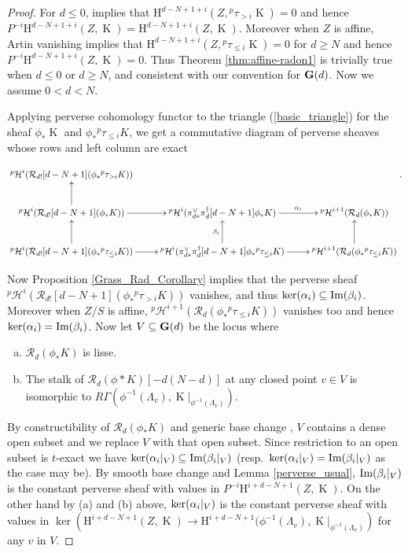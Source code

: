 \documentclass[12pt, reqno]{amsart}
\theoremstyle{plain}
\theoremstyle{definition}
\theoremstyle{definition}
\newcommand{\bG}{{\bf G}}
\newcommand{\cR}{{\mathcal R}}
\newcommand{\cpH}{{^p\mathcal{H}}}
\DeclareMathOperator{\KK}{K}
\begin{document}
\begin{proof}\label{proof_thm_affine_Rad}
For $d \leq 0$, \cite[4.2.4]{BBDG18} implies that $\mathrm{H}^{d-N+1+i}(Z, {}^p\tau_{>i}\KK)=0$ and hence $P^{-i}\mathrm{H}^{d-N+1+i}(Z, \KK)=\mathrm{H}^{d-N+1+i}(Z, \KK)$. Moreover when $Z$ is affine, Artin vanishing implies that $\mathrm{H}^{d-N+1+i}(Z, {}^p\tau_{\leq i}\KK)=0$ for $d \geq N$ and hence $P^{-i}\mathrm{H}^{d-N+1+i}(Z, \KK)=0$. Thus Theorem \ref{thm:affine-radon1} is trivially true when $d\leq0$ or $d \geq N$, and consistent with our convention for $\bG(d)$. Now we assume $0<d<N$.

Applying perverse cohomology functor to the triangle (\ref{basic_triangle}) for the sheaf $\phi_*\KK$ and $\phi_*{}^p\tau_{ \leq i}K$, we get a commutative diagram of perverse sheaves whose rows and left column are exact

   \begin{equation*}
       \xymatrix{  \cpH^i(\cR_{d!}[d-N+1](\phi_*{}^p\tau_{>i}K)) & & \\
                   \cpH^i(\cR_{d!}[d-N+1](\phi_*K)) \ar[r] \ar[u] & \cpH^i(\pi^{\vee}_{d*}\pi_d^{\dagger}[d-N+1]\phi_*K) \ar^-{\alpha_i}[r] & \cpH^{i+1}(\cR_d(\phi_*K)) \\
                   \cpH^i(\cR_{d!}[d-N+1](\phi_*{}^p\tau_{ \leq i}K)) \ar[r] \ar[u] & \cpH^i(\pi^{\vee}_{d*}\pi_d^{\dagger}[d-N+1]\phi_*{}^p\tau_{ \leq i}K) \ar[r] \ar^-{\beta_i}[u] & \cpH^{i+1}(\cR_d(\phi_*{}^p\tau_{ \leq i}K)) \ar[u] }.
   \end{equation*}

Now Proposition \ref{Grass_Rad_Corollary} implies that the perverse sheaf $\cpH^i(\cR_{d!}[d-N+1](\phi_*{}^p\tau_{>i}K))$ vanishes, and thus $\textup{ker}(\alpha_i) \subseteq \textup{Im}(\beta_i)$. Moreover when $Z/S$ is affine, $\cpH^{i+1}(\cR_d(\phi_*{}^p\tau_{ \leq i}K))$ vanishes too and hence $\textup{ker}(\alpha_i)=\textup{Im}(\beta_i)$. Now let $V \subseteq \bG(d)$ be the locus where 
\begin{enumerate}[(a)]
    \item $\cR_{d}(\phi_*K)$ is lisse.
    \item The stalk of $\cR_d(\phi*K)[-d(N-d)]$ at any closed point $v \in V$ is isomorphic to $R\Gamma(\phi^{-1}(\Lambda_v),\KK|_{\phi^{-1}(\Lambda_v)})$.
\end{enumerate}

By constructibility of $\cR_{d}(\phi_*K)$ and generic base change \cite[Chapitre 7. Th\'eor\`eme 1.9]{SGA4.5}, $V$ contains a dense open subset and we replace $V$ with that open subset. Since restriction to an open subset is $t$-exact we have $\textup{ker}(\alpha_i|_{V})\subseteq\textup{Im}(\beta_i|_{V})$ (resp.~$\textup{ker}(\alpha_i|_{V})=\textup{Im}(\beta_i|_{V})$ as the case may be). By smooth base change and Lemma \ref{perverse_usual}, $\textup{Im}(\beta_i|_{V})$ is the constant perverse sheaf with values in $P^{-i}\mathrm{H}^{i+d-N+1}(Z, \KK)$. On the other hand by (a) and (b) above, $\textup{ker}(\alpha_i|_{V})$ is the constant perverse sheaf with values in $\ker \left(\mathrm{H}^{i+d-N+1}(Z, \KK) \to \mathrm{H}^{i+d-N+1}(\phi^{-1}(\Lambda_v),\KK|_{\phi^{-1}(\Lambda_v)}\right)$ for any $v$ in $V$.
\end{proof}
\end{document}
